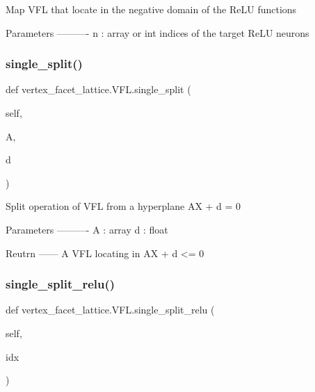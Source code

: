 \begin{DoxyVerb}Map VFL that locate in the negative domain of the ReLU functions

Parameters
----------
n : array or int
    indices of the target ReLU neurons\end{DoxyVerb}
 \mbox{\label{classvertex__facet__lattice_1_1VFL_a1024ee850939d4c02e21c0398d3bfc8a}} 
\subsubsection{\texorpdfstring{single\+\_\+split()}{single\_split()}}
{\footnotesize\ttfamily def vertex\+\_\+facet\+\_\+lattice.\+V\+F\+L.\+single\+\_\+split (\begin{DoxyParamCaption}\item[{}]{self,  }\item[{}]{A,  }\item[{}]{d }\end{DoxyParamCaption})}

\begin{DoxyVerb}Split operation of VFL from a hyperplane AX + d = 0

Parameters
----------
A : array
d : float

Reutrn
------
A VFL locating in AX + d <= 0
\end{DoxyVerb}
 \mbox{\label{classvertex__facet__lattice_1_1VFL_afee114c93d9ab6cf9cc36af9dab9ddfd}} 
\subsubsection{\texorpdfstring{single\+\_\+split\+\_\+relu()}{single\_split\_relu()}}
{\footnotesize\ttfamily def vertex\+\_\+facet\+\_\+lattice.\+V\+F\+L.\+single\+\_\+split\+\_\+relu (\begin{DoxyParamCaption}\item[{}]{self,  }\item[{}]{idx }\end{DoxyParamCaption})}

